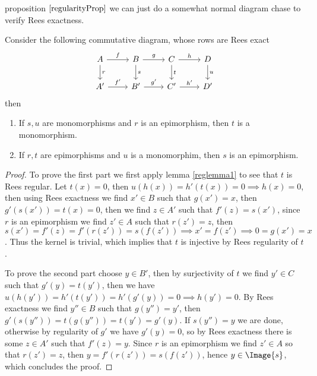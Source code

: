 proposition $\ref{regularityProp}$ we can just do a somewhat normal diagram chase to verify Rees exactness.
\begin{lemma}
    Consider the following commutative diagram, whose rows are Rees exact
    \[\begin{tikzcd}
        A & B & C & D \\
        {A'} & {B'} & {C'} & {D'}
        \arrow["f", from=1-1, to=1-2]
        \arrow["r", from=1-1, to=2-1]
        \arrow["g", from=1-2, to=1-3]
        \arrow["s", from=1-2, to=2-2]
        \arrow["h", from=1-3, to=1-4]
        \arrow["t", from=1-3, to=2-3]
        \arrow["u", from=1-4, to=2-4]
        \arrow["{f'}", from=2-1, to=2-2]
        \arrow["{g'}", from=2-2, to=2-3]
        \arrow["{h'}", from=2-3, to=2-4]
    \end{tikzcd}\]
    then
    \begin{enumerate}
        \item If $s,u$ are monomorphisms and $r$ is an epimorphism, then $t$ is a monomorphism.
        \item If $r,t$ are epimorphisms and $u$ is a monomorphim, then $s$ is an epimorphism.
    \end{enumerate}
\end{lemma}
\begin{proof}[Proof]
    To prove the first part we first apply lemma \ref{reglemma1} to see that $t$ is Rees regular. Let $t(x)=0$, then 
    $u(h(x)) = h'(t(x))=0 \implies h(x)=0$, then using Rees exactness we find $x'\in B$ such that $g(x')=x$, then 
    $g'(s(x')) = t(x) = 0$, then we find $z\in A'$ such that $f'(z)=s(x')$, since $r$ is an epimorphism we find $z'\in A$
    such that $r(z')=z$, then $s(x')=f'(z)=f'(r(z'))=s(f(z')) \implies x'=f(z') \implies 0=g(x')=x$. Thus the kernel is 
    trivial, which implies that $t$ is injective by Rees regularity of $t$. \par
    To prove the second part choose $y\in B'$, then by surjectivity of $t$ we find $y'\in C$ such that $g'(y)=t(y')$, then 
    we have $u(h(y')) = h'(t(y'))= h'(g'(y)) = 0 \implies h(y')=0$. By Rees exactness we find $y''\in B$ such that 
    $g(y'')=y'$, then $g'(s(y'')) = t(g(y'')) = t(y') = g'(y)$. If $s(y'')=y$ we are done, otherwise by regularity of $g'$ we 
    have $g'(y)=0$, so by Rees exactness there is some $z\in A'$ such that $f'(z)=y$. Since $r$ is an epimorphism we find $z'\in A$
    so that $r(z')=z$, then $y = f'(r(z')) = s(f(z'))$, hence $y\in\Image{s}$, which concludes the proof.
\end{proof}
